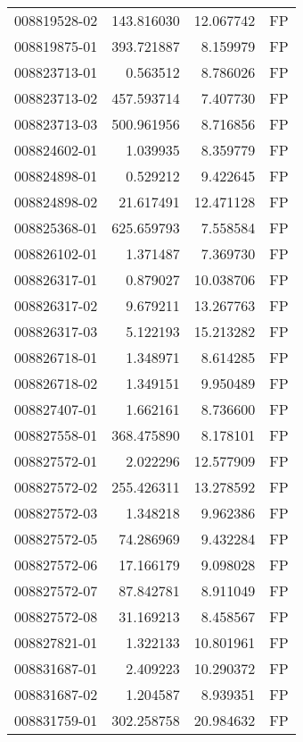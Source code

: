 \begin{tabular}{lrrl}
008819528-02 &  143.816030 &      12.067742 &   FP \\
008819875-01 &  393.721887 &       8.159979 &   FP \\
008823713-01 &    0.563512 &       8.786026 &   FP \\
008823713-02 &  457.593714 &       7.407730 &   FP \\
008823713-03 &  500.961956 &       8.716856 &   FP \\
008824602-01 &    1.039935 &       8.359779 &   FP \\
008824898-01 &    0.529212 &       9.422645 &   FP \\
008824898-02 &   21.617491 &      12.471128 &   FP \\
008825368-01 &  625.659793 &       7.558584 &   FP \\
008826102-01 &    1.371487 &       7.369730 &   FP \\
008826317-01 &    0.879027 &      10.038706 &   FP \\
008826317-02 &    9.679211 &      13.267763 &   FP \\
008826317-03 &    5.122193 &      15.213282 &   FP \\
008826718-01 &    1.348971 &       8.614285 &   FP \\
008826718-02 &    1.349151 &       9.950489 &   FP \\
008827407-01 &    1.662161 &       8.736600 &   FP \\
008827558-01 &  368.475890 &       8.178101 &   FP \\
008827572-01 &    2.022296 &      12.577909 &   FP \\
008827572-02 &  255.426311 &      13.278592 &   FP \\
008827572-03 &    1.348218 &       9.962386 &   FP \\
008827572-05 &   74.286969 &       9.432284 &   FP \\
008827572-06 &   17.166179 &       9.098028 &   FP \\
008827572-07 &   87.842781 &       8.911049 &   FP \\
008827572-08 &   31.169213 &       8.458567 &   FP \\
008827821-01 &    1.322133 &      10.801961 &   FP \\
008831687-01 &    2.409223 &      10.290372 &   FP \\
008831687-02 &    1.204587 &       8.939351 &   FP \\
008831759-01 &  302.258758 &      20.984632 &   FP \\

\end{tabular}
